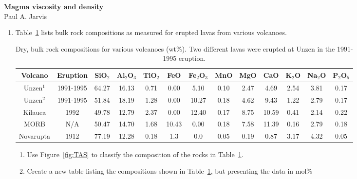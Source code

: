 \documentclass[]{book}
\theoremstyle{definition}
\begin{document}
\begin{center}
{\textbf{Magma viscosity and density}}\\
Paul A. Jarvis\\ %
\end{center}

\vspace{0.2 cm}


\begin{enumerate}
\item Table~\ref{tab:comp} lists bulk rock compositions as measured for erupted lavas from various volcanoes. 

  \begin{table}[h!]
    \centering
    \caption{Dry, bulk rock compositions for various volcanoes (wt\%). Two different lavas were erupted at Unzen in the 1991-1995 eruption. \label{tab:comp}}
    \begin{tabular}{|c|c|c c c c c c c c c c c|}
      \hline
      Volcano & Eruption & SiO$_{2}$ & Al$_{2}$O$_{3}$ & TiO$_{2}$ & FeO & Fe$_{2}$O$_{3}$ & MnO & MgO & CaO & K$_{2}$O & Na$_{2}$O & P$_{2}$O$_{5}$ \\
      \hline
      Unzen$^{1}$ & 1991-1995 & 64.27 & 16.13 & 0.71 & 0.00 & 5.10 & 0.10 & 2.47 & 4.69 & 2.54 & 3.81 & 0.17 \\
      Unzen$^{2}$ & 1991-1995 & 51.84 & 18.19 & 1.28 & 0.00 & 10.27 & 0.18 & 4.62 & 9.43 & 1.22 & 2.79 & 0.17 \\
      Kilauea & 1992 & 49.78 & 12.79 & 2.37 & 0.00 & 12.40 & 0.17 & 8.75 & 10.59 & 0.41 & 2.14 & 0.22 \\
      MORB & N/A & 50.47 & 14.70 & 1.68 & 10.43 & 0.00 & 0.18 & 7.58 & 11.39 & 0.16 & 2.79 & 0.18 \\
      Novarupta & 1912 & 77.19 & 12.28 & 0.18 & 1.3 & 0.0 & 0.05 & 0.19 & 0.87 & 3.17 & 4.32 & 0.05 \\
      \hline
    \end{tabular}
  \end{table}

  \begin{enumerate}
  \item Use Figure~\ref{fig:TAS} to classify the composition of the rocks in Table~\ref{tab:comp}. 
  \item Create a new table listing the compositions shown in Table~\ref{tab:comp}, but presenting the data in mol\%
  \end{enumerate}


\end{enumerate}
\end{document}
